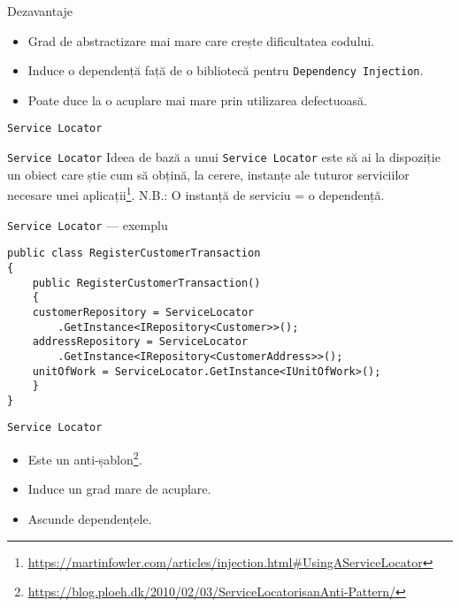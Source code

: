 \documentclass[presentation]{beamer}
\begin{document}
\begin{frame}[label={sec:org62c8223},fragile]{Dezavantaje}
 \begin{itemize}
\item Grad de abstractizare mai mare care crește dificultatea codului.
\item Induce o dependență față de o bibliotecă pentru \texttt{Dependency Injection}.
\item Poate duce la o acuplare mai mare prin utilizarea defectuoasă.
\end{itemize}
\end{frame}
\begin{frame}[label={sec:org13a90a0},fragile]{\texttt{Service Locator}}
 \begin{block}{\texttt{Service Locator}}
  Ideea de bază a unui \texttt{Service Locator} este să ai la dispoziție un obiect care știe cum să obțină, la cerere, instanțe ale tuturor serviciilor necesare unei aplicații\footnote{\url{https://martinfowler.com/articles/injection.html\#UsingAServiceLocator}}.
\vskip 0.5in
\alert{N.B.}: O instanță de serviciu = o dependență.
\end{block}
\end{frame}
\begin{frame}[label={sec:orgf5fa64a},fragile]{\texttt{Service Locator} --- exemplu}
 \begin{verbatim}
public class RegisterCustomerTransaction
{
    public RegisterCustomerTransaction()
    {
	customerRepository = ServiceLocator
	    .GetInstance<IRepository<Customer>>();
	addressRepository = ServiceLocator
	    .GetInstance<IRepository<CustomerAddress>>();
	unitOfWork = ServiceLocator.GetInstance<IUnitOfWork>();
    }
}
\end{verbatim}
\end{frame}
\begin{frame}[label={sec:org5d2d30d},fragile]{\texttt{Service Locator}}
 \begin{itemize}
\item \alert{Este un anti-șablon}\footnote{\url{https://blog.ploeh.dk/2010/02/03/ServiceLocatorisanAnti-Pattern/}}.
\item Induce un grad mare de acuplare.
\item Ascunde dependențele.
\end{itemize}
\end{frame}
\end{document}
